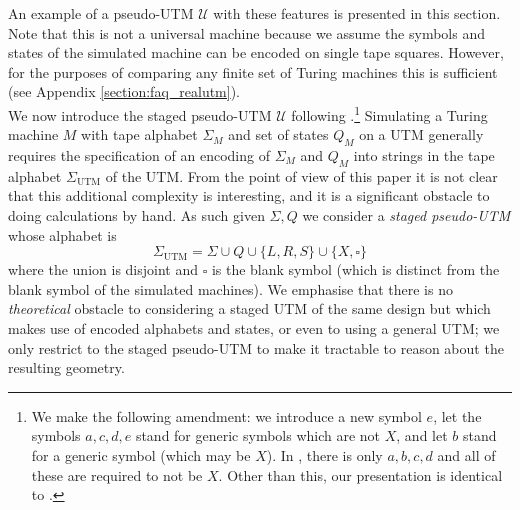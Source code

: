 \documentclass[english,letter paper,12pt,reqno]{article}
\theoremstyle{definition}
\begin{document}
An example of a pseudo-UTM $\mathcal{U}$ with these features is presented in this section. Note that this is not a universal machine because we assume the symbols and states of the simulated machine can be encoded on single tape squares. However, for the purposes of comparing any finite set of Turing machines this is sufficient (see Appendix \ref{section:faq_realutm}).
\\

We now introduce the staged pseudo-UTM $\mathcal{U}$ following \cite{clift2021geometry}.\footnote{We make the following amendment: we introduce a new symbol $e$, let the symbols $a,c,d,e$ stand for generic symbols which are not $X$, and let $b$ stand for a generic symbol (which may be $X$). In \cite{clift2021geometry}, there is only $a,b,c,d$ and all of these are required to not be $X$. Other than this, our presentation is identical to \cite{clift2021geometry}.} Simulating a Turing machine $M$ with tape alphabet $\Sigma_M$ and set of states $Q_M$ on a UTM generally requires the specification of an encoding of $\Sigma_M$ and $Q_M$ into strings in the tape alphabet $\Sigma_{\text{UTM}}$ of the UTM. From the point of view of this paper it is not clear that this additional complexity is interesting, and it is a significant obstacle to doing calculations by hand. As such given $\Sigma, Q$ we consider a \emph{staged pseudo-UTM} whose alphabet is
\[
\Sigma_{\text{UTM}} = \Sigma \cup Q \cup \{L,R,S\} \cup \{X, \square\}
\]
where the union is disjoint and $\square$ is the blank symbol (which is distinct from the blank symbol of the simulated machines). We emphasise that there is no \emph{theoretical} obstacle to considering a staged UTM of the same design but which makes use of encoded alphabets and states, or even to using a general UTM; we only restrict to the staged pseudo-UTM to make it tractable to reason about the resulting geometry. 
\end{document}
